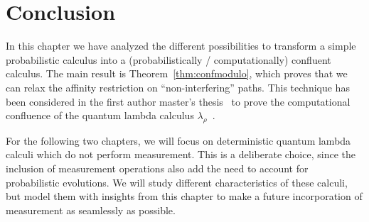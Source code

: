 \section{Conclusion}
In this chapter we have analyzed the different possibilities to transform a simple probabilistic calculus into a (probabilistically / computationally) confluent calculus. The main result is Theorem~\ref{thm:confmodulo}, which proves that we can relax the affinity restriction on ``non-interfering'' paths. This technique has been considered in the first author master's thesis~\cite{Romero20} to prove the computational confluence of the quantum lambda calculus $\lambda_\rho$~\cite{lambdarho}.

For the following two chapters, we will focus on deterministic quantum lambda calculi which do not perform measurement. This is a deliberate choice, since the inclusion of measurement operations also add the need to account for probabilistic evolutions. We will study different characteristics of these calculi, but model them with insights from this chapter to make a future incorporation of measurement as seamlessly as possible.
